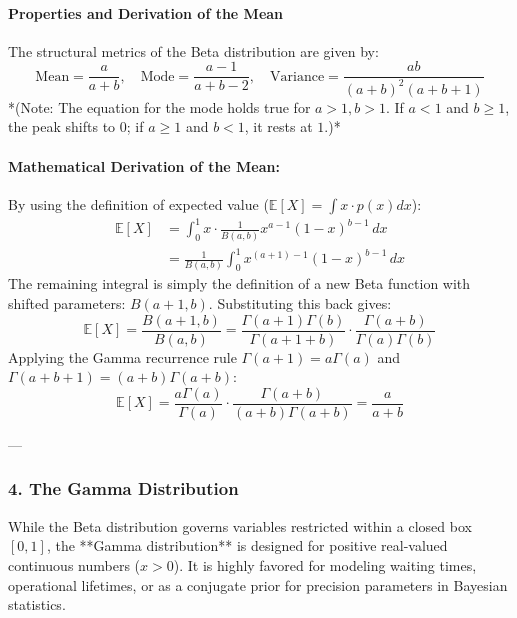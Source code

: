 \documentclass{article}
\begin{document}
\paragraph{Properties and Derivation of the Mean}
The structural metrics of the Beta distribution are given by:
\begin{equation}
\text{Mean} = \frac{a}{a+b}, \quad \text{Mode} = \frac{a - 1}{a + b - 2}, \quad \text{Variance} = \frac{ab}{(a+b)^2(a+b+1)} \tag{201}
\end{equation}
*(Note: The equation for the mode holds true for $a>1, b>1$. If $a<1$ and $b \ge 1$, the peak shifts to $0$; if $a \ge 1$ and $b<1$, it rests at $1$.)*

\paragraph{Mathematical Derivation of the Mean:}
By using the definition of expected value ($\mathbb{E}[X] = \int x \cdot p(x) dx$):
\begin{align*}
\mathbb{E}[X] &= \int_{0}^{1} x \cdot \frac{1}{B(a, b)} x^{a-1}(1-x)^{b-1} \, dx \\
&= \frac{1}{B(a, b)} \int_{0}^{1} x^{(a+1)-1}(1-x)^{b-1} \, dx
\end{align*}
The remaining integral is simply the definition of a new Beta function with shifted parameters: $B(a+1, b)$. Substituting this back gives:
\begin{equation*}
\mathbb{E}[X] = \frac{B(a+1, b)}{B(a, b)} = \frac{\Gamma(a+1)\Gamma(b)}{\Gamma(a+1+b)} \cdot \frac{\Gamma(a+b)}{\Gamma(a)\Gamma(b)}
\end{equation*}
Applying the Gamma recurrence rule $\Gamma(a+1) = a\Gamma(a)$ and $\Gamma(a+b+1) = (a+b)\Gamma(a+b)$:
\begin{equation*}
\mathbb{E}[X] = \frac{a\Gamma(a)}{\Gamma(a)} \cdot \frac{\Gamma(a+b)}{(a+b)\Gamma(a+b)} = \frac{a}{a+b}
\end{equation*}

---

\subsubsection*{4. The Gamma Distribution}

While the Beta distribution governs variables restricted within a closed box $[0,1]$, the **Gamma distribution** is designed for positive real-valued continuous numbers ($x > 0$). It is highly favored for modeling waiting times, operational lifetimes, or as a conjugate prior for precision parameters in Bayesian statistics.
\end{document}
